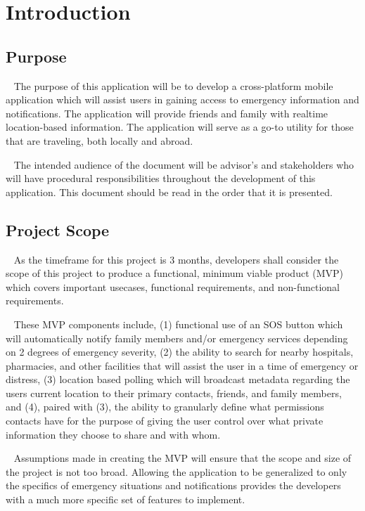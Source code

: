 \documentclass{scrreprt}
\begin{document}
\chapter{Introduction}


\section{Purpose}
\par ~ The purpose of this application will be to develop a cross-platform mobile application which will assist users in gaining access to emergency information and notifications. The application will provide friends and family with realtime location-based information. The application will serve as a go-to utility for those that are traveling, both locally and abroad.
\par ~ The intended audience of the document will be advisor's and stakeholders who will have procedural responsibilities throughout the development of this application. This document should be read in the order that it is presented. 


\section{Project Scope}
\par ~ As the timeframe for this project is 3 months, developers shall consider the scope of this project to produce a functional, minimum viable product (MVP) which covers important usecases, functional requirements, and non-functional requirements. 

\par ~ These MVP components include, (1) functional use of an SOS button which will automatically notify family members and/or emergency services depending on 2 degrees of emergency severity, (2) the ability to search for nearby hospitals, pharmacies, and other facilities that will assist the user in a time of emergency or distress, (3) location based polling which will broadcast metadata regarding the users current location to their primary contacts, friends, and family members, and (4), paired with (3), the ability to granularly define what permissions contacts have for the purpose of giving the user control over what private information they choose to share and with whom.

\par ~ Assumptions made in creating the MVP will ensure that the scope and size of the project is not too broad. Allowing the application to be generalized to only the specifics of emergency situations and notifications provides the developers with a much more specific set of features to implement.
\end{document}
